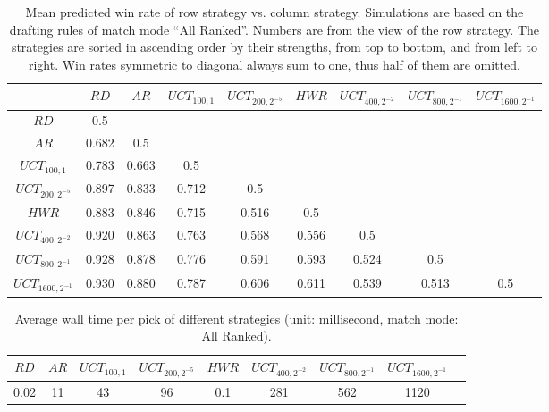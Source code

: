 \begin{table}
  \begin{adjustwidth}{-.6in}{-.5in}  
  \caption{Mean predicted win rate of row strategy  vs. column strategy. Simulations are based on the drafting rules of match mode ``All Ranked''. Numbers are from the view of the row strategy. The strategies are sorted in ascending order by their strengths, from top to bottom, and from left to right. Win rates symmetric to diagonal always sum to one, thus half of them are omitted.}
  \label{tab:mcts}
  \centering
  \begin{tabular}{ccccccccc}
    \toprule
      & $RD$ & $AR$ & $UCT_{100, 1}$ & $UCT_{200, 2^{-5}}$ & $HWR$  & $UCT_{400, 2^{-2}}$ & $UCT_{800, 2^{-1}}$ & $UCT_{1600, 2^{-1}}$ \\
    \midrule
    $RD$ & 0.5 &  &  &  &  &  &  &  \\
    $AR$ & 0.682 & 0.5 &  &  &  &  &  & \\
    $UCT_{100, 1}$ & 0.783 & 0.663 & 0.5 & & &  &  \\
    $UCT_{200, 2^{-5}}$ & 0.897 & 0.833 & 0.712 & 0.5 & & & \\
    $HWR$ & 0.883 & 0.846 & 0.715 & 0.516 & 0.5 \\
    $UCT_{400, 2^{-2}}$ & 0.920 & 0.863 & 0.763 & 0.568 & 0.556 & 0.5   \\
    $UCT_{800, 2^{-1}}$ & 0.928 & 0.878  & 0.776 &  0.591 & 0.593 & 0.524 & 0.5 &  \\
$UCT_{1600, 2^{-1}}$ & 0.930 & 0.880  & 0.787 & 0.606 & 0.611 & 0.539 & 0.513 & 0.5 \\
  \bottomrule
  \end{tabular}
  \end{adjustwidth}
\end{table}

\begin{table}
  \caption{Average wall time per pick of different strategies (unit: millisecond, match mode: All Ranked).}
  \label{tab:mcts_time}
  \centering
  \begin{tabular}{ccccccccc}
    \toprule
      $RD$ & $AR$ & $UCT_{100, 1}$ & $UCT_{200, 2^{-5}}$ & $HWR$  & $UCT_{400, 2^{-2}}$ & $UCT_{800, 2^{-1}}$ & $UCT_{1600, 2^{-1}}$ \\
    \midrule
     0.02 & 11 & 43 & 96 & 0.1 & 281 & 562 & 1120 \\
    \bottomrule
\end{tabular}
\end{table}

